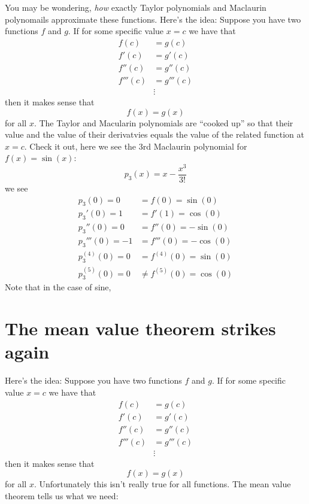 \documentclass{ximera}
\begin{document}
You may be wondering, \textit{how} exactly Taylor polynomials and
Maclaurin polynomails approximate these functions. Here's the idea:
Suppose you have two functions $f$ and $g$. If for some specific value
$x=c$ we have that
\begin{align*}
  f(c) &= g(c)\\
  f'(c) &= g'(c)\\
  f''(c) &= g''(c)\\
  f'''(c) &= g'''(c)\\
          &\vdots
\end{align*}
then it makes sense that 
\[
f(x) = g(x)
\]
for all $x$. The Taylor and Macularin polynomials are ``cooked up'' so
that their value and the value of their derivatvies equals the value
of the related function at $x=c$. Check it out, here we see the $3$rd
Maclaurin polynomial for $f(x) = \sin(x)$:
\[
p_3(x) = x - \frac{x^3}{3!} 
\]
we see
\begin{align*}
  p_3(0) = 0 &= f(0) = \sin(0)\\
  p_3'(0) = 1 &= f'(1) = \cos(0)\\
  p_3''(0) = 0 &= f''(0) = -\sin(0)\\
  p_3'''(0) = -1 &= f'''(0) = -\cos(0)\\
  p_3^{(4)}(0) = 0 &= f^{(4)}(0) = \sin(0)\\
  p_3^{(5)}(0) = 0 &\ne f^{(5)}(0) = \cos(0)
\end{align*}
Note that in the case of sine, 


\section{The mean value theorem strikes again}

Here's the idea: Suppose you have two functions $f$ and $g$. If for
some specific value $x=c$ we have that
\begin{align*}
  f(c) &= g(c)\\
  f'(c) &= g'(c)\\
  f''(c) &= g''(c)\\
  f'''(c) &= g'''(c)\\
          &\vdots
\end{align*}
then it makes sense that 
\[
f(x) = g(x)
\]
for all $x$. Unfortunately this isn't really true for all functions. The mean value theorem tells us what we need:
\end{document}
